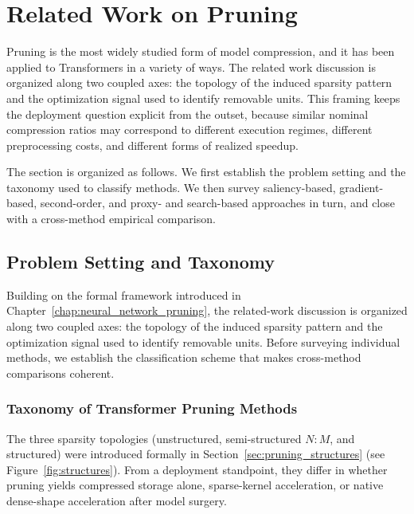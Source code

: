 ﻿\section{Related Work on Pruning}
Pruning is the most widely studied form of model compression, and it has been applied to Transformers in a variety of ways. The related work discussion is organized along two coupled axes: the topology of the induced sparsity pattern and the optimization signal used to identify removable units. This framing keeps the deployment question explicit from the outset, because similar nominal compression ratios may correspond to different execution regimes, different preprocessing costs, and different forms of realized speedup.

The section is organized as follows. We first establish the problem setting and the taxonomy used to classify methods. We then survey saliency-based, gradient-based, second-order, and proxy- and search-based approaches in turn, and close with a cross-method empirical comparison.

\subsection{Problem Setting and Taxonomy}

\newcommand{\methoddetail}[1]{%
    \par\medskip
    \noindent{\bfseries #1}\par
    \smallskip\noindent
}

Building on the formal framework introduced in Chapter~\ref{chap:neural_network_pruning}, the related-work discussion is organized along two coupled axes: the topology of the induced sparsity pattern and the optimization signal used to identify removable units. Before surveying individual methods, we establish the classification scheme that makes cross-method comparisons coherent.

\subsubsection{Taxonomy of Transformer Pruning Methods}

The three sparsity topologies (unstructured, semi-structured $N\!:\!M$, and structured) were introduced formally in Section~\ref{sec:pruning_structures} (see Figure~\ref{fig:structures}). From a deployment standpoint, they differ in whether pruning yields compressed storage alone, sparse-kernel acceleration, or native dense-shape acceleration after model surgery.

